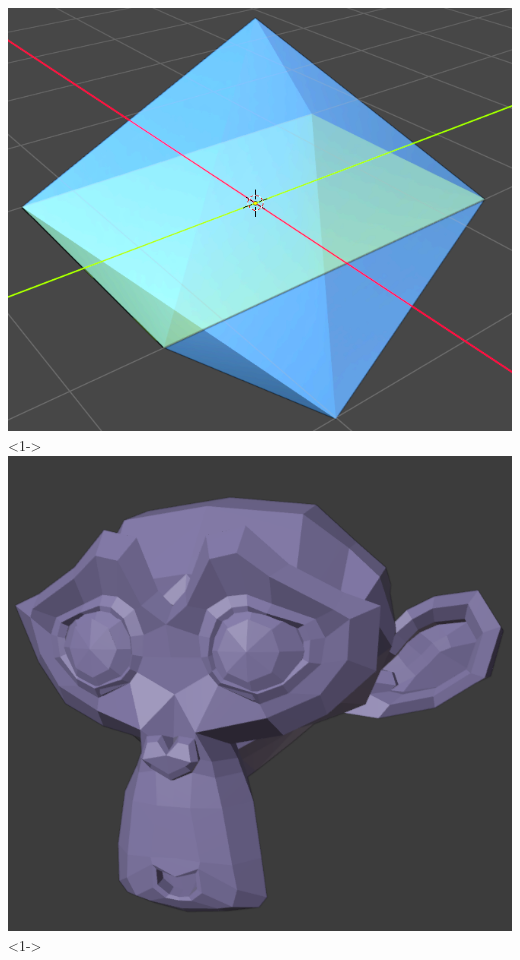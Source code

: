 \documentclass[UTF8]{ctexbeamer}	%
\theoremstyle{plain}
\theoremstyle{definition}
\theoremstyle{remark}
\numberwithin{equation}{section}
\begin{document}
\begin{frame}
\begin{columns}
        \includegraphics[width = \textwidth]{fig/wrong5em.png}
        <1->
        \includegraphics[width = \textwidth]{fig/wrong6.png}
        <1->

\end{columns}
\end{frame}
\end{document}

